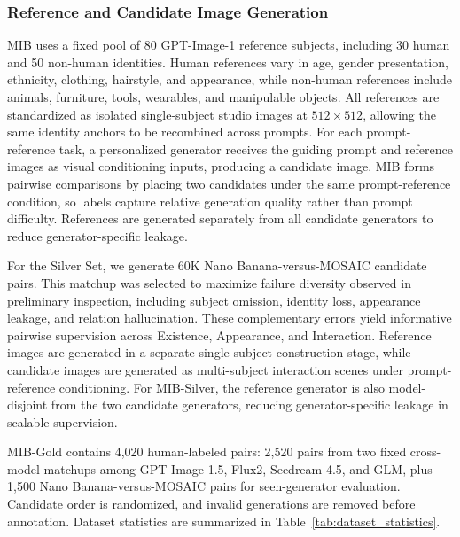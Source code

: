 \documentclass{article}
\begin{document}
\subsubsection{Reference and Candidate Image Generation}

MIB uses a fixed pool of 80 GPT-Image-1 reference subjects, including 30 human and 50 non-human identities. Human references vary in age, gender presentation, ethnicity, clothing, hairstyle, and appearance, while non-human references include animals, furniture, tools, wearables, and manipulable objects. All references are standardized as isolated single-subject studio images at $512 \times 512$, allowing the same identity anchors to be recombined across prompts. For each prompt-reference task, a personalized generator receives the guiding prompt and reference images as visual conditioning inputs, producing a candidate image. MIB forms pairwise comparisons by placing two candidates under the same prompt-reference condition, so labels capture relative generation quality rather than prompt difficulty. References are generated separately from all candidate generators to reduce generator-specific leakage.

For the Silver Set, we generate 60K Nano Banana-versus-MOSAIC candidate pairs. This matchup was selected to maximize failure diversity observed in preliminary inspection, including subject omission, identity loss, appearance leakage, and relation hallucination. These complementary errors yield informative pairwise supervision across Existence, Appearance, and Interaction. Reference images are generated in a separate single-subject construction stage, while candidate images are generated as multi-subject interaction scenes under prompt-reference conditioning. For MIB-Silver, the reference generator is also model-disjoint from the two candidate generators, reducing generator-specific leakage in scalable supervision.

MIB-Gold contains 4,020 human-labeled pairs: 2,520 pairs from two fixed cross-model matchups among GPT-Image-1.5, Flux2, Seedream 4.5, and GLM, plus 1,500 Nano Banana-versus-MOSAIC pairs for seen-generator evaluation. Candidate order is randomized, and invalid generations are removed before annotation. Dataset statistics are summarized in Table~\ref{tab:dataset_statistics}.
\end{document}
